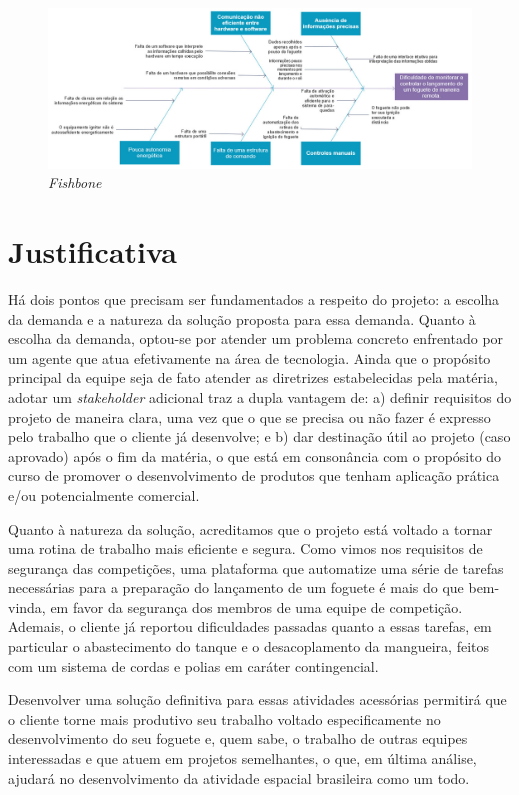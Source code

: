 \begin{figure}[H]
\centering
\includegraphics[width=\textwidth]{figuras/Fishbone}
\caption{\textit{Fishbone}}
\label{fig:fishbone}
\end{figure}

\section{Justificativa}

Há dois pontos que precisam ser fundamentados a respeito do projeto: a escolha da demanda e a natureza da solução proposta para essa demanda. Quanto à escolha da demanda, optou-se por atender um problema concreto enfrentado por um agente que atua efetivamente na área de tecnologia. Ainda que o propósito principal da equipe seja de fato atender as diretrizes estabelecidas pela matéria, adotar um \textit{stakeholder} adicional traz a dupla vantagem de: a) definir requisitos do projeto de maneira clara, uma vez que o que se precisa ou não fazer é expresso pelo trabalho que o cliente já desenvolve; e b) dar destinação útil ao projeto (caso aprovado) após o fim da matéria, o que está em consonância com o propósito do curso de promover o desenvolvimento de produtos que tenham aplicação prática e/ou potencialmente comercial.
\par Quanto à natureza da solução, acreditamos que o projeto está voltado a tornar uma rotina de trabalho mais eficiente e segura. Como vimos nos requisitos de segurança das competições, uma plataforma que automatize uma série de tarefas necessárias para a preparação do lançamento de um foguete é mais do que bem-vinda, em favor da segurança dos membros de uma equipe de competição. Ademais, o cliente já reportou dificuldades passadas quanto a essas tarefas, em particular o abastecimento do tanque e o desacoplamento da mangueira, feitos com um sistema de cordas e polias em caráter contingencial. \par Desenvolver uma solução definitiva para essas atividades acessórias permitirá que o cliente torne mais produtivo seu trabalho voltado especificamente no desenvolvimento do seu foguete e, quem sabe, o trabalho de outras equipes interessadas e que atuem em projetos semelhantes, o que, em última análise, ajudará no desenvolvimento da atividade espacial brasileira como um todo.